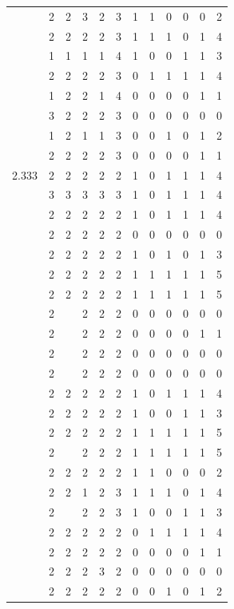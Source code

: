 \documentclass[]{msu-thesis}
\theoremstyle{definition}
\theoremstyle{definition}
\theoremstyle{definition}
\theoremstyle{remark}
\begin{document}
\begin{table}
{\begin{tabular}[t]{rrrrrrrrrrrr}
 & 2 & 2 & 3 & 2 & 3 & 1 & 1 & 0 & 0 & 0 & 2\\
 & 2 & 2 & 2 & 2 & 3 & 1 & 1 & 1 & 0 & 1 & 4\\
 & 1 & 1 & 1 & 1 & 4 & 1 & 0 & 0 & 1 & 1 & 3\\
 & 2 & 2 & 2 & 2 & 3 & 0 & 1 & 1 & 1 & 1 & 4\\
 & 1 & 2 & 2 & 1 & 4 & 0 & 0 & 0 & 0 & 1 & 1\\
 & 3 & 2 & 2 & 2 & 3 & 0 & 0 & 0 & 0 & 0 & 0\\
 & 1 & 2 & 1 & 1 & 3 & 0 & 0 & 1 & 0 & 1 & 2\\
 & 2 & 2 & 2 & 2 & 3 & 0 & 0 & 0 & 0 & 1 & 1\\
2.333 & 2 & 2 & 2 & 2 & 2 & 1 & 0 & 1 & 1 & 1 & 4\\
 & 3 & 3 & 3 & 3 & 3 & 1 & 0 & 1 & 1 & 1 & 4\\
 & 2 & 2 & 2 & 2 & 2 & 1 & 0 & 1 & 1 & 1 & 4\\
 & 2 & 2 & 2 & 2 & 2 & 0 & 0 & 0 & 0 & 0 & 0\\
 & 2 & 2 & 2 & 2 & 2 & 1 & 0 & 1 & 0 & 1 & 3\\
 & 2 & 2 & 2 & 2 & 2 & 1 & 1 & 1 & 1 & 1 & 5\\
 & 2 & 2 & 2 & 2 & 2 & 1 & 1 & 1 & 1 & 1 & 5\\
 & 2 &  & 2 & 2 & 2 & 0 & 0 & 0 & 0 & 0 & 0\\
 & 2 &  & 2 & 2 & 2 & 0 & 0 & 0 & 0 & 1 & 1\\
 & 2 &  & 2 & 2 & 2 & 0 & 0 & 0 & 0 & 0 & 0\\
 & 2 &  & 2 & 2 & 2 & 0 & 0 & 0 & 0 & 0 & 0\\
 & 2 & 2 & 2 & 2 & 2 & 1 & 0 & 1 & 1 & 1 & 4\\
 & 2 & 2 & 2 & 2 & 2 & 1 & 0 & 0 & 1 & 1 & 3\\
 & 2 & 2 & 2 & 2 & 2 & 1 & 1 & 1 & 1 & 1 & 5\\
 & 2 &  & 2 & 2 & 2 & 1 & 1 & 1 & 1 & 1 & 5\\
 & 2 & 2 & 2 & 2 & 2 & 1 & 1 & 0 & 0 & 0 & 2\\
 & 2 & 2 & 1 & 2 & 3 & 1 & 1 & 1 & 0 & 1 & 4\\
 & 2 &  & 2 & 2 & 3 & 1 & 0 & 0 & 1 & 1 & 3\\
 & 2 & 2 & 2 & 2 & 2 & 0 & 1 & 1 & 1 & 1 & 4\\
 & 2 & 2 & 2 & 2 & 2 & 0 & 0 & 0 & 0 & 1 & 1\\
 & 2 & 2 & 2 & 3 & 2 & 0 & 0 & 0 & 0 & 0 & 0\\
 & 2 & 2 & 2 & 2 & 2 & 0 & 0 & 1 & 0 & 1 & 2\\

\end{tabular}}
\end{table}
\end{document}
